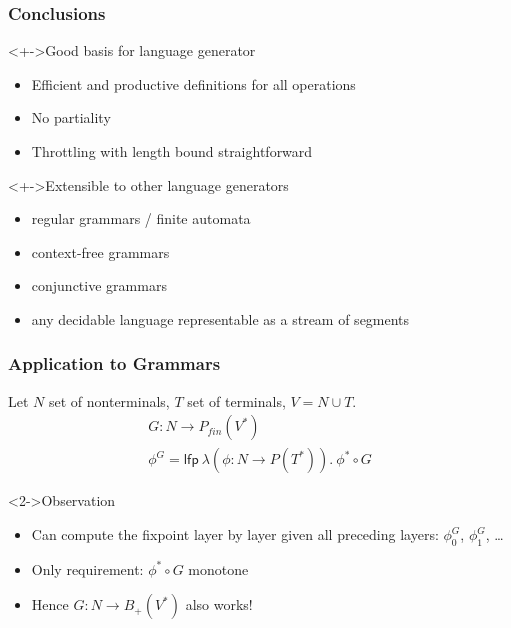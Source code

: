 \documentclass[pdftex,aspectratio=169]{beamer}
\begin{document}
\begin{frame}
  \frametitle{Conclusions}
  \begin{block}<+->{Good basis for language generator}
    \begin{itemize}
    \item Efficient and productive definitions for all operations
    \item No partiality
    \item Throttling with length bound straightforward
    \end{itemize}
  \end{block}
  \begin{block}<+->{Extensible to other language generators}
    \begin{itemize}
    \item regular grammars / finite automata
    \item context-free grammars
    \item conjunctive grammars
    \item any decidable language representable as a stream of segments 
    \end{itemize}
  \end{block}
\end{frame}
\begin{frame}
  \frametitle{Application to Grammars}
  Let $N$ set of nonterminals, $T$ set of terminals, $V=N\cup T$.
  \begin{gather*}
    G : N \to P_{fin} (V^*)
    \\
    \phi^G = \mathsf{lfp}\ \lambda (\phi : N \to P (T^*)).\  \phi^* \circ G
  \end{gather*}
  \begin{exampleblock}<2->{Observation}
    \begin{itemize}
    \item Can compute the fixpoint layer by layer given all preceding
      layers: $\phi^G_0$, $\phi^G_1$, \dots
    \item Only requirement: $\phi^* \circ G$ monotone
    \item Hence $G : N \to B_+ (V^*)$ also works!
  \end{itemize}
  \end{exampleblock}
\end{frame}
\end{document}
